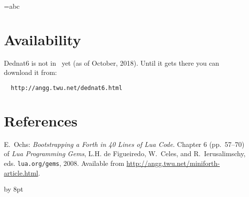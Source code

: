 \documentclass{ltugboat}
\begin{document}
=\hbox{abc}

\def\IGNORETHIS{
 (eepitch-shell)
 (eepitch-kill)
 (eepitch-shell)
lualatex 2018tugboat.tex
print(tex.box[0])
print(tex.box[0].id,        node.id("hlist"))
print(tex.box[0].list)
print(tex.box[0].list.id,   node.id("glyph"))
print(tex.box[0].list.char, string.byte("a"))
print(tex.box[0].list.next)
print(tex.box[0].list.next.char,
                            string.byte("b"))
}







%
\section{Availability}

Dednat6 is not in \CTAN\ yet (as of October, 2018). Until it gets there
you can download it from:

\begin{verbatim}
  http://angg.twu.net/dednat6.html
\end{verbatim}



%                                                  
\section*{References}


{\frenchspacing
[1] E.\ Ochs: {\sl Bootstrapping a Forth in 40 Lines of Lua Code}.
Chapter 6 (pp.\ 57--70) of {\sl Lua Programming Gems}, L.H. de
Figueiredo, W.\ Celes, and R.\ Ierusa\-limschy, eds. {\tt lua.org/gems},
2008. Available from \url{http://angg.twu.net/miniforth-article.html}.

}





\advance\signaturewidth by 8pt
\makesignature
\end{document}
